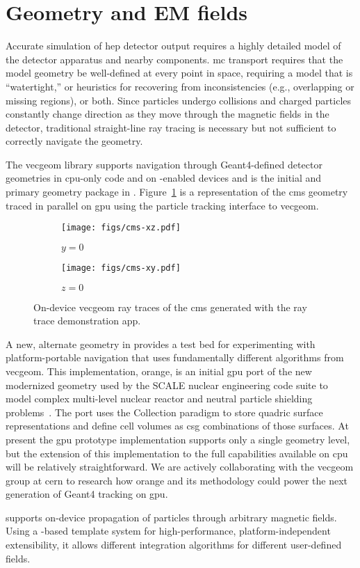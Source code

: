 \section{Geometry and EM fields}

Accurate simulation of \ac{hep} detector output requires a highly detailed model
of the detector apparatus and nearby components. \ac{mc} transport requires that
the model geometry be well-defined at every point in space, requiring a model
that is ``watertight,'' or heuristics for recovering from inconsistencies (e.g.,
overlapping or missing regions), or both. Since particles undergo collisions and
charged particles constantly change direction as they move through the magnetic
fields in the detector, traditional straight-line ray tracing is necessary but
not sufficient to correctly navigate the geometry.

The \acs{vecgeom} library supports navigation through Geant4-defined detector
geometries in \ac{cpu}-only code and on \cuda-enabled devices
\cite{apostolakis_towards_2015} and is the initial and primary geometry package
in \celeritas. Figure~\ref{fig:vecgeom-cms} is a representation of the \ac{cms}
geometry traced in parallel on \ac{gpu} using the \celeritas particle tracking
interface to \acs{vecgeom}.
\begin{figure}
  \centering%
  \begin{subfigure}{3in}%
    \centering%
    \texttt{[image: figs/cms-xz.pdf]}%
    \caption{$y=0$}%
  \end{subfigure}%
  \begin{subfigure}{3in}%
    \centering%
    \texttt{[image: figs/cms-xy.pdf]}%
    \caption{$z=0$}%
  \end{subfigure}
  \caption{On-device \acs{vecgeom} ray traces of the \acs{cms} generated with
the \celeritas ray trace demonstration app.}
\label{fig:vecgeom-cms}
\end{figure}

A new, alternate geometry in \celeritas provides a test bed for experimenting
with platform-portable navigation that uses fundamentally different algorithms
from \acs{vecgeom}. This implementation, \ac{orange}, is an initial \ac{gpu}
port of the new modernized geometry used by the SCALE nuclear engineering code
suite to model complex multi-level nuclear reactor and neutral particle
shielding problems~\cite{scale}. The \celeritas port uses the Collection paradigm
%
%
to store quadric surface representations and
define cell volumes as \ac{csg} combinations of those surfaces. At present the
\ac{gpu} prototype implementation supports only a single geometry level, but the
extension of this implementation to the full capabilities available on \ac{cpu}
will be relatively straightforward. We are actively collaborating with the
\acs{vecgeom} group at \acs{cern} to research how \ac{orange} and its
methodology could power the next generation of Geant4 tracking on \ac{gpu}.

\celeritas supports on-device propagation of particles through arbitrary
magnetic fields. Using a \Cpp-based template system for high-performance,
platform-independent extensibility, it allows different integration algorithms
for different user-defined fields.
